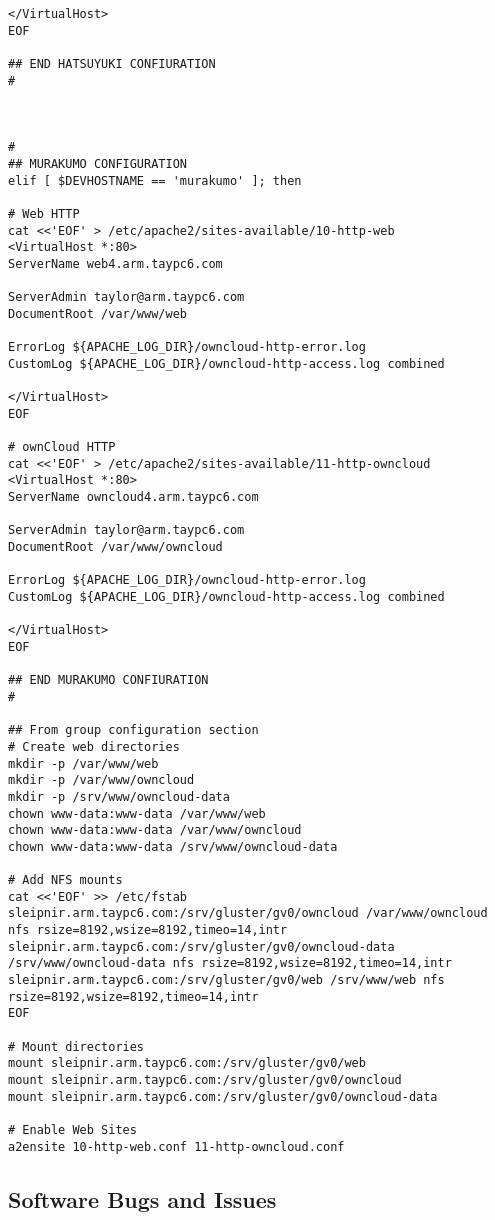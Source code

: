 \documentclass[12pt]{spieman}  %
\begin{document}
\begin{lstlisting}
</VirtualHost>
EOF

## END HATSUYUKI CONFIURATION
#



#
## MURAKUMO CONFIGURATION
elif [ $DEVHOSTNAME == 'murakumo' ]; then

# Web HTTP
cat <<'EOF' > /etc/apache2/sites-available/10-http-web
<VirtualHost *:80>
ServerName web4.arm.taypc6.com

ServerAdmin taylor@arm.taypc6.com
DocumentRoot /var/www/web

ErrorLog ${APACHE_LOG_DIR}/owncloud-http-error.log
CustomLog ${APACHE_LOG_DIR}/owncloud-http-access.log combined

</VirtualHost>
EOF

# ownCloud HTTP
cat <<'EOF' > /etc/apache2/sites-available/11-http-owncloud
<VirtualHost *:80>
ServerName owncloud4.arm.taypc6.com

ServerAdmin taylor@arm.taypc6.com
DocumentRoot /var/www/owncloud

ErrorLog ${APACHE_LOG_DIR}/owncloud-http-error.log
CustomLog ${APACHE_LOG_DIR}/owncloud-http-access.log combined

</VirtualHost>
EOF

## END MURAKUMO CONFIURATION
#

## From group configuration section
# Create web directories
mkdir -p /var/www/web
mkdir -p /var/www/owncloud
mkdir -p /srv/www/owncloud-data
chown www-data:www-data /var/www/web
chown www-data:www-data /var/www/owncloud
chown www-data:www-data /srv/www/owncloud-data

# Add NFS mounts
cat <<'EOF' >> /etc/fstab
sleipnir.arm.taypc6.com:/srv/gluster/gv0/owncloud /var/www/owncloud nfs rsize=8192,wsize=8192,timeo=14,intr
sleipnir.arm.taypc6.com:/srv/gluster/gv0/owncloud-data /srv/www/owncloud-data nfs rsize=8192,wsize=8192,timeo=14,intr
sleipnir.arm.taypc6.com:/srv/gluster/gv0/web /srv/www/web nfs rsize=8192,wsize=8192,timeo=14,intr
EOF

# Mount directories
mount sleipnir.arm.taypc6.com:/srv/gluster/gv0/web
mount sleipnir.arm.taypc6.com:/srv/gluster/gv0/owncloud
mount sleipnir.arm.taypc6.com:/srv/gluster/gv0/owncloud-data

# Enable Web Sites
a2ensite 10-http-web.conf 11-http-owncloud.conf
\end{lstlisting}

\subsection{Software Bugs and Issues}
\label{subsec:issues}
\end{document}
